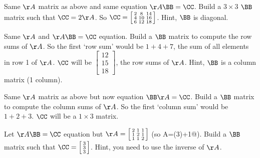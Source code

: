 \begin{hwenumerate}
\item Same $\AA$ matrix as above and same equation $\AA \BB = \CC$.  Build a $3 \times 3$ $\BB$ matrix such that $\CC=2\AA$.  So $\CC=\left[ \begin{smallmatrix}2&8&14\\ 4&10&16\\ 6&12&18\end{smallmatrix}\right]$. Hint, $\BB$ is diagonal.
\item Same $\AA$ and $\AA \BB=\CC$ equation.  Build a $\BB$ matrix to compute the row sums of $\AA$.  So the first `row sum' would be $1+4+7$, the sum of all elements in row 1 of $\AA$.  $\CC$ will be $\left[ \begin{smallmatrix}12\\ 15\\ 18\end{smallmatrix}\right]$, the row sums of $\AA$. Hint, $\BB$ is a column matrix (1 column).
\item Same $\AA$ matrix as above but now equation $\BB \AA  = \CC$.  Build a $\BB$ matrix to compute the column sums of $\AA$.  So the first `column sum' would be $1+2+3$.  $\CC$ will be a $1 \times 3$ matrix.
\item Let $\AA \BB=\CC$ equation but $\AA=\left[ \begin{smallmatrix}2&1&1\\1&2&1\\1&1&2\end{smallmatrix}\right]$ (so A=\verb@diag(3)+1@).  Build a $\BB$ matrix such that $\CC=\left[ \begin{smallmatrix}3\\ 3\\ 3\end{smallmatrix}\right]$. Hint, you need to use the inverse of $\AA$.

\end{hwenumerate}

